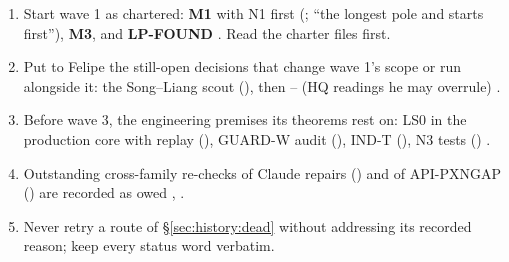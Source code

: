 \begin{agentnote}
\begin{enumerate}[leftmargin=1.4em]
\item Start wave 1 as chartered: \textbf{M1} with N1 first (; ``the longest pole and starts first''), \textbf{M3}, and \textbf{LP-FOUND} . Read the charter files first.
\item Put to Felipe the still-open decisions that change wave 1's scope or run alongside it: the Song--Liang scout (), then -- (HQ readings he may overrule) .
\item Before wave 3, the engineering premises its theorems rest on: LS0 in the production core with replay (), GUARD-W audit (), IND-T (), N3 tests () .
\item Outstanding cross-family re-checks of Claude repairs () and of API-PXNGAP () are recorded as owed , .
\item Never retry a route of \S\ref{sec:history:dead} without addressing its recorded reason; keep every status word verbatim.
\end{enumerate}
\end{agentnote}

